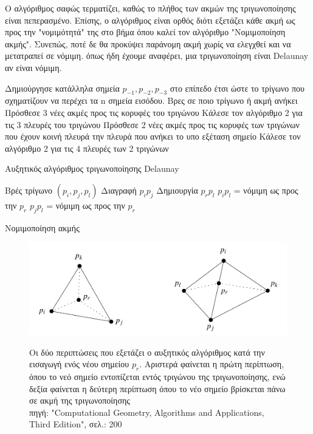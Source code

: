 \documentclass[oneside,12pt]{book}
\newenvironment{matlab}
	{\begin{figure}[hp]\centering\captionsetup{justification=centering}}
	{\end{figure}}
\theoremstyle{definition}
\begin{document}
Ο αλγόριθμος σαφώς τερματίζει, καθώς το πλήθος των ακμών της τριγωνοποίησης είναι πεπερασμένο. Επίσης, ο αλγόριθμος είναι ορθός διότι εξετάζει κάθε ακμή ως προς την "νομιμότητά" της στο βήμα όπου καλεί τον αλγόριθμο "Νομιμοποίηση ακμής". Συνεπώς, ποτέ δε θα προκύψει παράνομη ακμή χωρίς να ελεγχθεί και να μετατραπεί σε νόμιμη. όπως ήδη έχουμε αναφέρει, μια τριγωνοποίηση είναι Delaunay αν είναι νόμιμη. \\

\begin{algorithm}[H]
	\SetAlgoLined
	
	Δημιούργησε κατάλληλα σημεία \(p_{-1}, p_{-2}, p_{-3}\) στο επίπεδο έτσι ώστε το τρίγωνο που σχηματίζουν να περέχει τα n σημεία εισόδου. \;
	{Βρες σε ποιο τρίγωνο ή ακμή ανήκει \;
		{Πρόσθεσε 3 νέες ακμές προς τις κορυφές του τριγώνου \;
		Κάλεσε τον αλγόριθμο 2 για τις 3 πλευρές του τριγώνου \;}
	\Else
		{Πρόσθεσε 2 νέες ακμές προς τις κορυφές των τριγώνων που έχουν κοινή πλευρά την πλευρά που ανήκει το υπο εξέταση σημείο \;
		Κάλεσε τον αλγόριθμο 2 για τις 4 πλευρές των 2 τριγώνων \;}
	}	
	
	\caption{Αυξητικός αλγόριθμος τριγωνοποίησης Delaunay}
\end{algorithm}

\begin{algorithm}[H]
	\SetAlgoLined
	
	Βρές τρίγωνο \((p_i, p_j, p_l)\) \;
	{Διαγραφή \(p_i p_j\) \;
	Δημιουργία \(p_r p_l\) \;
	\(p_i p_l\) = νόμιμη ως προς την \(p_r\) \;
	\(p_j p_l\) = νόμιμη ως προς την \(p_r\) \;}
	
	\caption{Νομιμοποίηση ακμής}
\end{algorithm}

\begin{matlab}
	\includegraphics[scale=0.3]{images/incremental.png}
	\caption{Οι δύο περιπτώσεις που εξετάζει ο αυξητικός αλγόριθμος κατά την εισαγωγή ενός νέου σημείου \(p_r\). Αριστερά φαίνεται η πρώτη περίπτωση, όπου το νεό σημείο εντοπίζεται εντός τριγώνου της τριγωνοποίησης, ενώ δεξία φαίνεται η δεύτερη περίπτωση όπου το νέο σημείο βρίσκεται πάνω σε ακμή της τριγωνοποίησης \\ πηγή: "Computational Geometry, Algorithms and Applications, Third Edition", σελ.: 200}
\end{matlab} 
\end{document}
